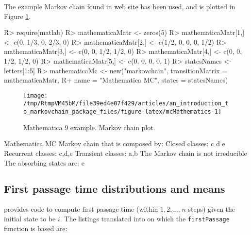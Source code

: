 \documentclass[
  nojss]{jss}
\begin{document}
The example Markov chain found in  web site \citep{mathematica9MarkovChain} has
been used, and is plotted in Figure \ref{fig:mcMathematics}.

\begin{CodeChunk}

\begin{CodeInput}
R> require(matlab)
R> mathematicaMatr <- zeros(5)
R> mathematicaMatr[1,] <- c(0, 1/3, 0, 2/3, 0)
R> mathematicaMatr[2,] <- c(1/2, 0, 0, 0, 1/2)
R> mathematicaMatr[3,] <- c(0, 0, 1/2, 1/2, 0)
R> mathematicaMatr[4,] <- c(0, 0, 1/2, 1/2, 0)
R> mathematicaMatr[5,] <- c(0, 0, 0, 0, 1)
R> statesNames <- letters[1:5]
R> mathematicaMc <- new("markovchain", transitionMatrix = mathematicaMatr,
R+                    name = "Mathematica MC", states = statesNames)
\end{CodeInput}
\end{CodeChunk}

\begin{CodeChunk}
\begin{figure}

{\centering \texttt{[image: /tmp/RtmpVM45bM/file39ed4e07f429/articles/an\_introduction\_to\_markovchain\_package\_files/figure-latex/mcMathematics-1]} 

}

\caption[Mathematica 9 example]{Mathematica 9 example. Markov chain plot.}\label{fig:mcMathematics}
\end{figure}
\end{CodeChunk}

\begin{CodeChunk}

\begin{CodeOutput}
Mathematica MC  Markov chain that is composed by: 
Closed classes: 
c d 
e 
Recurrent classes: 
{c,d},{e}
Transient classes: 
{a,b}
The Markov chain is not irreducible 
The absorbing states are: e
\end{CodeOutput}
\end{CodeChunk}

\hypertarget{first-passage-time-distributions-and-means}{%
\subsection{First passage time distributions and means}\label{first-passage-time-distributions-and-means}}

\cite{renaldoMatlab} provides code to compute first passage time (within \(1,2,\ldots, n\) steps) given the initial state to be \(i\). The  listings translated into  on which the \texttt{firstPassage} function is based are:
\end{document}
